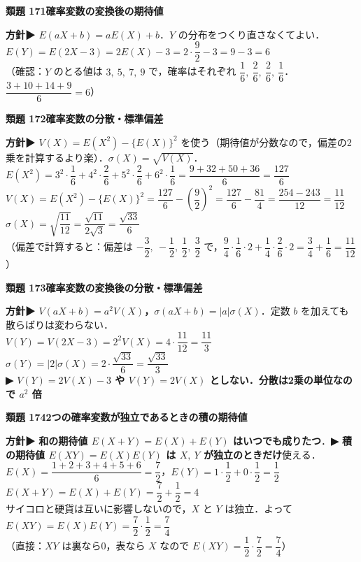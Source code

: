 \documentclass[a4paper,11pt]{ltjsarticle}
\newcommand{\ans}[2]{\Needspace{5\baselineskip}\vspace{6pt}%
  {\sffamily\bfseries 類題 #1\quad #2}\par}
\newcommand{\point}[1]{\textsf{\bfseries ▶ #1}}
\begin{document}
\ans{171}{確率変数の変換後の期待値}
\begin{kai}
\textbf{方針}\quad \point{$E(aX+b)=aE(X)+b$}．$Y$ の分布をつくり直さなくてよい．\\[2pt]
$E(Y)=E(2X-3)=2E(X)-3=2\cdot\dfrac92-3=9-3=6$\\
（確認：$Y$ のとる値は $3,\ 5,\ 7,\ 9$ で，確率はそれぞれ $\dfrac16,\ \dfrac26,\ \dfrac26,\ \dfrac16$．$\dfrac{3+10+14+9}6=6$）
\end{kai}

\ans{172}{確率変数の分散・標準偏差}
\begin{kai}
\textbf{方針}\quad \point{$V(X)=E(X^2)-\{E(X)\}^2$} を使う（期待値が分数なので，偏差の2乗を計算するより楽）．$\sigma(X)=\sqrt{V(X)}$．\\[2pt]
$E(X^2)=3^2\cdot\dfrac16+4^2\cdot\dfrac26+5^2\cdot\dfrac26+6^2\cdot\dfrac16=\dfrac{9+32+50+36}{6}=\dfrac{127}6$\\[2pt]
$V(X)=E(X^2)-\{E(X)\}^2=\dfrac{127}6-\left(\dfrac92\right)^2=\dfrac{127}6-\dfrac{81}4=\dfrac{254-243}{12}=\dfrac{11}{12}$\\[2pt]
$\sigma(X)=\sqrt{\dfrac{11}{12}}=\dfrac{\sqrt{11}}{2\sqrt3}=\dfrac{\sqrt{33}}6$\\
（偏差で計算すると：偏差は $-\dfrac32,\ -\dfrac12,\ \dfrac12,\ \dfrac32$ で，$\dfrac94\cdot\dfrac16\cdot2+\dfrac14\cdot\dfrac26\cdot2=\dfrac34+\dfrac16=\dfrac{11}{12}$）
\end{kai}

\ans{173}{確率変数の変換後の分散・標準偏差}
\begin{kai}
\textbf{方針}\quad \point{$V(aX+b)=a^2V(X)$，$\sigma(aX+b)=|a|\sigma(X)$}．定数 $b$ を加えても散らばりは変わらない．\\[2pt]
$V(Y)=V(2X-3)=2^2V(X)=4\cdot\dfrac{11}{12}=\dfrac{11}3$\\[2pt]
$\sigma(Y)=|2|\sigma(X)=2\cdot\dfrac{\sqrt{33}}6=\dfrac{\sqrt{33}}3$\\
\point{$V(Y)=2V(X)-3$ や $V(Y)=2V(X)$ としない．分散は2乗の単位なので $a^2$ 倍}
\end{kai}

\ans{174}{2つの確率変数が独立であるときの積の期待値}
\begin{kai}
\textbf{方針}\quad \point{和の期待値 $E(X+Y)=E(X)+E(Y)$ はいつでも成りたつ}．\point{積の期待値 $E(XY)=E(X)E(Y)$ は $X,\ Y$ が独立のときだけ}使える．\\[2pt]
$E(X)=\dfrac{1+2+3+4+5+6}{6}=\dfrac72$，\quad $E(Y)=1\cdot\dfrac12+0\cdot\dfrac12=\dfrac12$\\[2pt]
$E(X+Y)=E(X)+E(Y)=\dfrac72+\dfrac12=4$\\[2pt]
サイコロと硬貨は互いに影響しないので，$X$ と $Y$ は独立．よって\\
\hspace*{1.5em}$E(XY)=E(X)E(Y)=\dfrac72\cdot\dfrac12=\dfrac74$\\
（直接：$XY$ は裏なら0，表なら $X$ なので $E(XY)=\dfrac12\cdot\dfrac72=\dfrac74$）
\end{kai}
\end{document}
